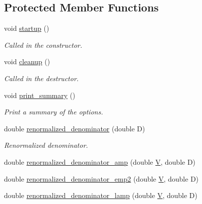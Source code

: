 \subsection*{Protected Member Functions}
\begin{DoxyCompactItemize}
\item 
void \mbox{\hyperlink{classforte_1_1_m_r_d_s_r_g___s_o_af51d45dc78bb9bfc3faf10a93f20837f}{startup}} ()
\begin{DoxyCompactList}\small\item\em Called in the constructor. \end{DoxyCompactList}\item 
void \mbox{\hyperlink{classforte_1_1_m_r_d_s_r_g___s_o_ae64f346885cfd022a5e2ef1714fa644a}{cleanup}} ()
\begin{DoxyCompactList}\small\item\em Called in the destructor. \end{DoxyCompactList}\item 
void \mbox{\hyperlink{classforte_1_1_m_r_d_s_r_g___s_o_a104abbbcdca7411479e01881ba1c5e3a}{print\+\_\+summary}} ()
\begin{DoxyCompactList}\small\item\em Print a summary of the options. \end{DoxyCompactList}\item 
double \mbox{\hyperlink{classforte_1_1_m_r_d_s_r_g___s_o_aa3c295302a4fd45ebb0cfcc990a0f4ba}{renormalized\+\_\+denominator}} (double D)
\begin{DoxyCompactList}\small\item\em Renormalized denominator. \end{DoxyCompactList}\item 
double \mbox{\hyperlink{classforte_1_1_m_r_d_s_r_g___s_o_a022b925648e2d3f0441670cd4d805327}{renormalized\+\_\+denominator\+\_\+amp}} (double \mbox{\hyperlink{classforte_1_1_m_r_d_s_r_g___s_o_a5282fcd5394254c50c626ad36dd6c0cd}{V}}, double D)
\item 
double \mbox{\hyperlink{classforte_1_1_m_r_d_s_r_g___s_o_a1db99e87f44c4c305fb8b17364ca5d8f}{renormalized\+\_\+denominator\+\_\+emp2}} (double \mbox{\hyperlink{classforte_1_1_m_r_d_s_r_g___s_o_a5282fcd5394254c50c626ad36dd6c0cd}{V}}, double D)
\item 
double \mbox{\hyperlink{classforte_1_1_m_r_d_s_r_g___s_o_a0a1fbb0f009a44cd97d8f4afafc16815}{renormalized\+\_\+denominator\+\_\+lamp}} (double \mbox{\hyperlink{classforte_1_1_m_r_d_s_r_g___s_o_a5282fcd5394254c50c626ad36dd6c0cd}{V}}, double D)

\end{DoxyCompactItemize}
